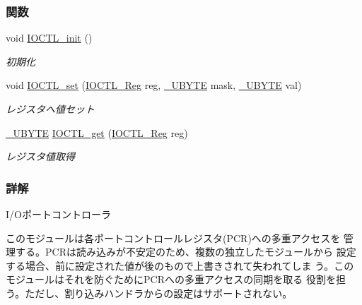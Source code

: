 \subsubsection*{関数}
\begin{DoxyCompactItemize}
\item 
void \hyperlink{ioctl_8h_a612c40c759c47ff99ee9eb3ba12d2c9f_a612c40c759c47ff99ee9eb3ba12d2c9f}{I\+O\+C\+T\+L\+\_\+init} ()
\begin{DoxyCompactList}\small\item\em 初期化 \end{DoxyCompactList}\item 
void \hyperlink{ioctl_8h_aa8d0d504f5e91de396d1cbb10d88314e_aa8d0d504f5e91de396d1cbb10d88314e}{I\+O\+C\+T\+L\+\_\+set} (\hyperlink{ioctl_8h_ada67108c6e5a5ec0258cbd4401f97662_ada67108c6e5a5ec0258cbd4401f97662}{I\+O\+C\+T\+L\+\_\+\+Reg} reg, \hyperlink{stddef_8h_aac464b47452ce9406f88ef194e2becc1_aac464b47452ce9406f88ef194e2becc1}{\+\_\+\+U\+B\+Y\+T\+E} mask, \hyperlink{stddef_8h_aac464b47452ce9406f88ef194e2becc1_aac464b47452ce9406f88ef194e2becc1}{\+\_\+\+U\+B\+Y\+T\+E} val)
\begin{DoxyCompactList}\small\item\em レジスタへ値セット \end{DoxyCompactList}\item 
\hyperlink{stddef_8h_aac464b47452ce9406f88ef194e2becc1_aac464b47452ce9406f88ef194e2becc1}{\+\_\+\+U\+B\+Y\+T\+E} \hyperlink{ioctl_8h_a3abacc0088f02290caa4cdfd00efabeb_a3abacc0088f02290caa4cdfd00efabeb}{I\+O\+C\+T\+L\+\_\+get} (\hyperlink{ioctl_8h_ada67108c6e5a5ec0258cbd4401f97662_ada67108c6e5a5ec0258cbd4401f97662}{I\+O\+C\+T\+L\+\_\+\+Reg} reg)
\begin{DoxyCompactList}\small\item\em レジスタ値取得 \end{DoxyCompactList}\end{DoxyCompactItemize}


\subsubsection{詳解}
I/\+Oポートコントローラ 

このモジュールは各ポートコントロールレジスタ(\+P\+C\+R)への多重アクセスを 管理する。\+P\+C\+Rは読み込みが不安定のため、複数の独立したモジュールから 設定する場合、前に設定された値が後のもので上書きされて失われてしま う。このモジュールはそれを防ぐために\+P\+C\+Rへの多重アクセスの同期を取る 役割を担う。ただし、割り込みハンドラからの設定はサポートされない。

